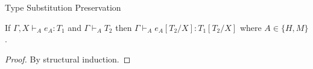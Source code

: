 \begin{lemma}{Type Substitution Preservation}

\label{lemtyp}

If $\Gamma,X\vdash_{A}e_{A}:T_{1}$ and $\Gamma\vdash_{A}T_{2}$ then $\Gamma\vdash_{A}e_{A}[T_{2}/X]:T_{1}[T_{2}/X]$ where $A\in\lbrace H,M\rbrace$.

\begin{proof}

By structural induction.

\end{proof}

\end{lemma}
